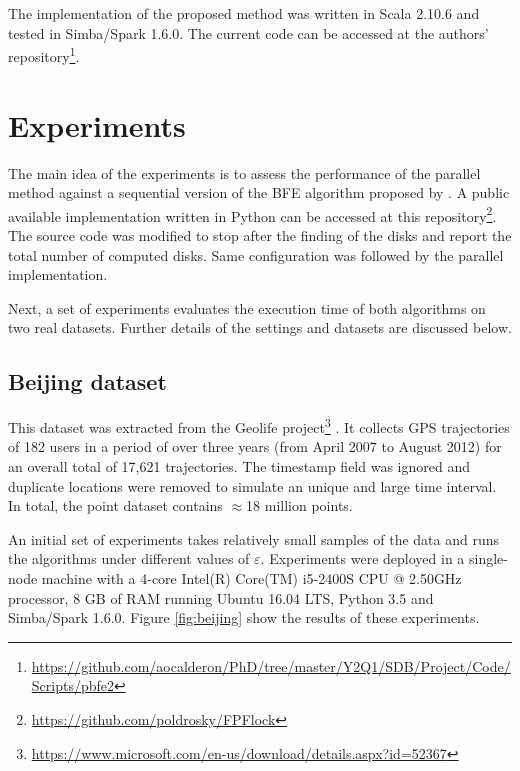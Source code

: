 \documentclass[12pt]{scrartcl}
\begin{document}
The implementation of the proposed method was written in Scala 2.10.6 and tested in Simba/Spark 1.6.0.  The current code can be accessed at the authors' repository\footnote{ \url{https://github.com/aocalderon/PhD/tree/master/Y2Q1/SDB/Project/Code/Scripts/pbfe2}}.

\section{Experiments}\label{sec:experiments}
% 

The main idea of the experiments is to assess the performance of the parallel method against a sequential version of the BFE algorithm proposed by \cite{vieira_-line_2009}.  A public available implementation written in Python can be accessed at this repository\footnote{\url{https://github.com/poldrosky/FPFlock}}.  The source code was modified to stop after the finding of the disks and report the total number of computed disks.  Same configuration was followed by the parallel implementation.

Next, a set of experiments evaluates the execution time of both algorithms on two real datasets.  Further details of the settings and datasets are discussed below.

\subsection{Beijing dataset}
This dataset was extracted from the Geolife project\footnote{\url{https://www.microsoft.com/en-us/download/details.aspx?id=52367}} \citep{zheng_understanding_2008, zheng_mining_2009, zheng_geolife:_2010}.  It collects GPS trajectories of 182 users in a period of over three years (from April 2007 to August 2012) for an overall total of 17,621 trajectories.  The timestamp field was ignored and duplicate locations were removed to simulate an unique and large time interval.  In total, the point dataset contains $\approx$18 million points.

An initial set of experiments takes relatively small samples of the data and runs the algorithms under different values of $\varepsilon$. Experiments were deployed in a single-node machine with a 4-core Intel(R) Core(TM) i5-2400S CPU @ 2.50GHz processor, 8 GB of RAM running Ubuntu 16.04 LTS, Python 3.5 and Simba/Spark 1.6.0.  Figure \ref{fig:beijing} show the results of these experiments.
\end{document}
